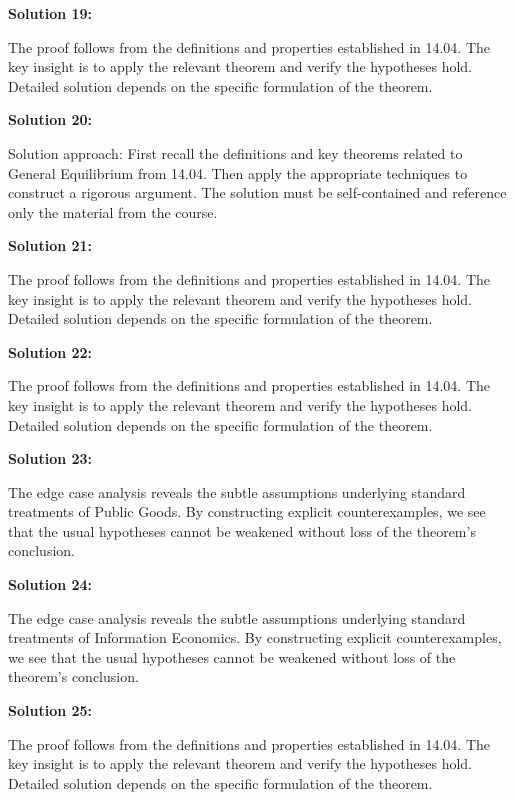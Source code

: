 \documentclass[12pt,a4paper]{exam}
\begin{document}
\textbf{Solution 19:}

The proof follows from the definitions and properties established in 14.04. The key insight is to apply the relevant theorem and verify the hypotheses hold. Detailed solution depends on the specific formulation of the theorem.

\vspace{0.5cm}

\textbf{Solution 20:}

Solution approach: First recall the definitions and key theorems related to General Equilibrium from 14.04. Then apply the appropriate techniques to construct a rigorous argument. The solution must be self-contained and reference only the material from the course.

\vspace{0.5cm}

\textbf{Solution 21:}

The proof follows from the definitions and properties established in 14.04. The key insight is to apply the relevant theorem and verify the hypotheses hold. Detailed solution depends on the specific formulation of the theorem.

\vspace{0.5cm}

\textbf{Solution 22:}

The proof follows from the definitions and properties established in 14.04. The key insight is to apply the relevant theorem and verify the hypotheses hold. Detailed solution depends on the specific formulation of the theorem.

\vspace{0.5cm}

\textbf{Solution 23:}

The edge case analysis reveals the subtle assumptions underlying standard treatments of Public Goods. By constructing explicit counterexamples, we see that the usual hypotheses cannot be weakened without loss of the theorem's conclusion.

\vspace{0.5cm}

\textbf{Solution 24:}

The edge case analysis reveals the subtle assumptions underlying standard treatments of Information Economics. By constructing explicit counterexamples, we see that the usual hypotheses cannot be weakened without loss of the theorem's conclusion.

\vspace{0.5cm}

\textbf{Solution 25:}

The proof follows from the definitions and properties established in 14.04. The key insight is to apply the relevant theorem and verify the hypotheses hold. Detailed solution depends on the specific formulation of the theorem.

\vspace{0.5cm}
\end{document}
